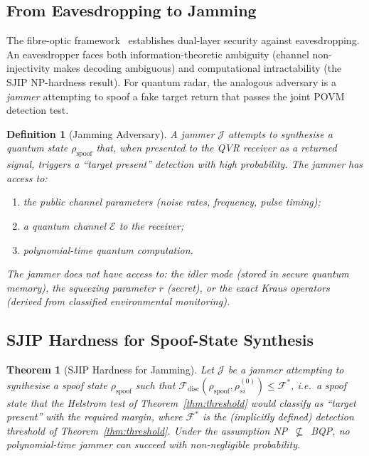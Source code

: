 \documentclass[journal]{IEEEtran}
\newtheorem{theorem}{Theorem}
\newtheorem{definition}{Definition}
\begin{document}
\subsection{From Eavesdropping to Jamming}

The fibre-optic framework~\cite{gautum2024rigorous} establishes dual-layer security against eavesdropping. An eavesdropper faces both information-theoretic ambiguity (channel non-injectivity makes decoding ambiguous) and computational intractability (the SJIP NP-hardness result). For quantum radar, the analogous adversary is a \textit{jammer} attempting to spoof a fake target return that passes the joint POVM detection test.

\begin{definition}[Jamming Adversary]\label{def:jammer}
A jammer $\mathcal{J}$ attempts to synthesise a quantum state $\rho_{\text{spoof}}$ that, when presented to the QVR receiver as a returned signal, triggers a ``target present'' detection with high probability. The jammer has access to:
\begin{enumerate}
    \item[(i)] the public channel parameters (noise rates, frequency, pulse timing);
    \item[(ii)] a quantum channel $\mathcal{E}$ to the receiver;
    \item[(iii)] polynomial-time quantum computation.
\end{enumerate}
The jammer does \textit{not} have access to: the idler mode (stored in secure quantum memory), the squeezing parameter $r$ (secret), or the exact Kraus operators (derived from classified environmental monitoring).
\end{definition}

\subsection{SJIP Hardness for Spoof-State Synthesis}

\begin{theorem}[SJIP Hardness for Jamming]\label{thm:sjip_jamming}
Let $\mathcal{J}$ be a jammer attempting to synthesise a spoof state $\rho_{\text{spoof}}$ such that $\mathcal{F}_{\text{disc}}(\rho_{\text{spoof}}, \rho_{si}^{(0)}) \leq \mathcal{F}^{*}$, i.e.\ a spoof state that the Helstrom test of Theorem~\ref{thm:threshold} would classify as ``target present'' with the required margin, where $\mathcal{F}^{*}$ is the (implicitly defined) detection threshold of Theorem~\ref{thm:threshold}. Under the assumption NP~$\not\subseteq$~BQP, no polynomial-time jammer can succeed with non-negligible probability.
\end{theorem}
\end{document}
